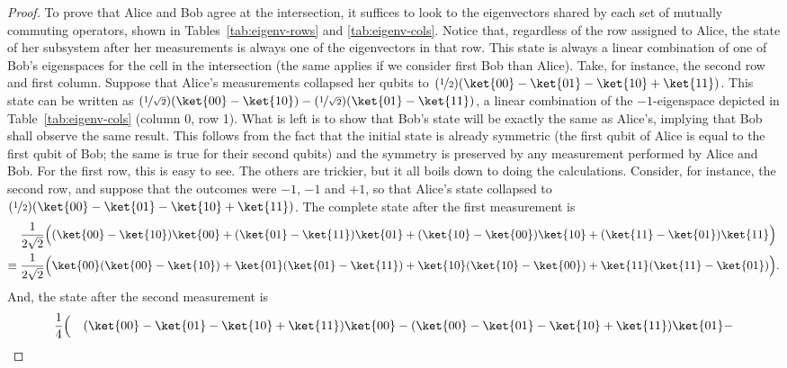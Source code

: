\documentclass{llncs}
\begin{document}
\begin{proof}
  To prove that Alice and Bob agree at the intersection, it suffices
  to look to the eigenvectors shared by each set of mutually commuting
  operators, shown in Tables~\ref{tab:eigenv-rows} and
  \ref{tab:eigenv-cols}.  Notice that, regardless of the row assigned
  to Alice, the state of her subsystem after her measurements is
  always one of the eigenvectors in that row. This state is always a
  linear combination of one of Bob's eigenspaces for the cell in the
  intersection (the same applies if we consider first Bob than Alice).
  Take, for instance, the second row and first column. Suppose that
  Alice's measurements collapsed her qubits to
  \((\nicefrac{1}{2}) (\ket{00} - \ket{01} - \ket{10} + \ket{11})\).
  This state can be written as
  \((\nicefrac{1}{\sqrt{2}}) (\ket{00} - \ket{10}) -
  (\nicefrac{1}{\sqrt{2}}) (\ket{01} - \ket{11})\), a linear
  combination of the \(-1\)-eigenspace depicted in
  Table~\ref{tab:eigenv-cols} (column 0, row 1).  What is left is to
  show that Bob's state will be exactly the same as Alice's, implying
  that Bob shall observe the same result. This follows from the fact
  that the initial state is already symmetric (the first qubit of
  Alice is equal to the first qubit of Bob; the same is true for their
  second qubits) and the symmetry is preserved by any measurement
  performed by Alice and Bob. For the first row, this is easy to see.
  The others are trickier, but it all boils down to doing the
  calculations.  Consider, for instance, the second row, and suppose
  that the outcomes were \(-1\), \(-1\) and \(+1\), so that Alice's
  state collapsed to
  \((\nicefrac{1}{2}) (\ket{00} - \ket{01} - \ket{10} +
  \ket{11})\). The complete state after the first measurement is
  \begin{align}
    &\frac{1}{2\sqrt{2}} \Bigl(
    (\ket{00} - \ket{10}) \ket{00} +
    (\ket{01} - \ket{11}) \ket{01} +
    (\ket{10} - \ket{00}) \ket{10} +
    (\ket{11} - \ket{01}) \ket{11}
    \Bigr) \nonumber \\
    \equiv\;
    & \frac{1}{2\sqrt{2}} \Bigl(
      \ket{00} (\ket{00} - \ket{10}) +
      \ket{01} (\ket{01} - \ket{11}) +
      \ket{10} (\ket{10} - \ket{00}) +
      \ket{11} (\ket{11} - \ket{01})
    \Bigr).
  \end{align}
  And, the state after the second measurement is
  \begin{alignat}{2}
    &\frac{1}{4} \Bigl(
      &&(\ket{00} - \ket{01} - \ket{10} + \ket{11}) \ket{00} -
        (\ket{00} - \ket{01} - \ket{10} + \ket{11}) \ket{01} - \nonumber \\

\end{alignat}
\end{proof}
\end{document}
